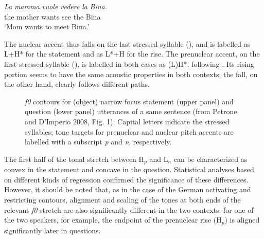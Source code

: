 \ea
\gll \textit{La} \textit{mamma} \textit{vuole} \textit{vedere} \textit{la} \textit{Bina.}\\
the mother wants see the Bina\\
\glt ‘Mom wants to meet Bina.’
\z

The nuclear accent thus falls on the last stressed syllable (), and is labelled as L+H* for the statement and as L*+H for the rise. The prenuclear accent, on the first stressed syllable (), is labelled in both cases as (L)H*, following \citet{gilifivela2003tonal,gilifivela2006coding}. Its rising portion seems to have the same acoustic properties in both contexts; the fall, on the other hand, clearly follows different paths.

\begin{figure}
\centering
{}
\caption{\textit{f0} contours for (object) narrow focus statement (upper panel) and question (lower panel) utterances of a same sentence (from Petrone and D'Imperio 2008, Fig. 1). Capital letters indicate the stressed syllables; tone targets for prenuclear and nuclear pitch accents are labelled with a subscript \textit{p} and \textit{n}, respectively.}
\label{fig210}\end{figure}

The first half of the tonal stretch between H$_{p}$ and L$_{n}$ can be characterized as convex in the statement and concave in the question. Statistical analyses based on different kinds of regression confirmed the significance of these differences. However, it should be noted that, as in the case of the German activating and restricting contours, alignment and scaling of the tones at both ends of the relevant \textit{f0} stretch are also significantly different in the two contexts: for one of the two speakers, for example, the endpoint of the prenuclear rise (H$_{p}$) is aligned significantly later in questions. 

